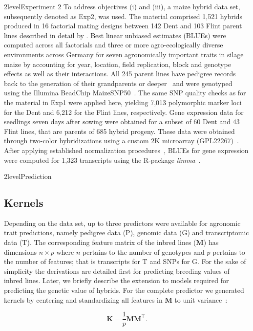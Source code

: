 \documentclass[12pt,titlepage]{article}
\begin{document}
\Genetics2level{Experiment 2}
To address objectives (i) and (iii), a maize hybrid data set, subsequently
denoted as Exp2, was used.
The material comprised 1,521 hybrids produced in 16 factorial mating designs
between 142 Dent and 103 Flint parent lines described in detail by
.
Best linear unbiased estimates (BLUEs) were computed across all factorials and 
three or more agro-ecologically diverse environments across Germany for seven
agronomically important traits in silage maize by accounting for year, location,
field replication, block and genotype effects as well as their interactions.
All 245 parent lines have pedigree records back to the generation of their 
grandparents or deeper~\cite{Westhues2017} and were genotyped using the Illumina 
BeadChip MaizeSNP50~\cite{Ganal2011}.
The same SNP quality checks as for the material in Exp1 were applied here,
yielding 7,013 polymorphic marker loci for the Dent and 6,212 for the Flint
lines, respectively.
Gene expression data for seedlings seven days after sowing were obtained for a 
subset of 60 Dent and 43 Flint lines, that are parents of 685 hybrid progeny.
These data were obtained through two-color hybridizations using a custom 2K 
microarray (GPL22267)~\cite{Westhues2017}.
After applying established normalization procedures~\cite{Smyth2003,Ritchie2007},
BLUEs for gene expression were computed for 1,323 transcripts
\cite{Westhues2017} using the R-package \emph{limma}~\cite{Ritchie2015a}.




\Genetics2level{Prediction}
\subsection{Kernels}
Depending on the data set, up to three predictors were available for agronomic
trait predictions, namely pedigree data (P), genomic data (G) and
transcriptomic data (T).
The corresponding feature matrix of the inbred lines ($\mathbf{M}$) has
dimensions $n \times p$ where $n$ pertains to the number of genotypes and $p$
pertains to the number of features; that is transcripts for T and SNPs for G.
For the sake of simplicity the derivations are detailed first for predicting
breeding values of inbred lines.
Later, we briefly describe the extension to models required for predicting the
genetic value of hybrids.
For the complete predictor we generated kernels by centering and standardizing
all features in $\mathbf{M}$ to unit variance~\cite{VanRaden2008}:

\begin{equation} \label{eq:GenomicRelationship}
  \mathbf{K} = \frac{1}{p} \mathbf{M} \mathbf{M}^{\top}.
\end{equation}
\end{document}
